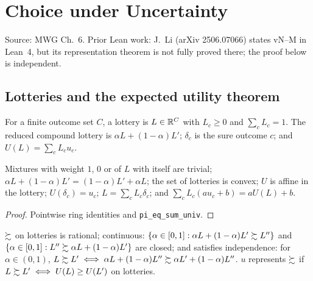 \chapter{Choice under Uncertainty}
\label{chap:uncertainty}

Source: MWG Ch.~6. Prior Lean work: J.~Li (arXiv 2506.07066) states vN--M in Lean~4, but its
representation theorem is not fully proved there; the proof below is independent.

\section{Lotteries and the expected utility theorem}
\label{sec:vnm}

\begin{definition}
\label{def:lottery}
\leanok
For a finite outcome set $C$, a lottery is $L \in \mathbb{R}^C$ with $L_c \ge 0$ and $\sum_c L_c = 1$. The
reduced compound lottery is $\alpha L + (1-\alpha) L'$; $\delta_c$ is the sure outcome $c$; and
$U(L) = \sum_c L_c u_c$.
\end{definition}

\begin{lemma}
\label{lem:mix-algebra}
\leanok
{}
Mixtures with weight $1$, $0$ or of $L$ with itself are trivial; $\alpha L + (1-\alpha)L' =
(1-\alpha)L' + \alpha L$; the set of lotteries is convex; $U$ is affine in the lottery;
$U(\delta_c) = u_c$; $L = \sum_c L_c \delta_c$; and $\sum_c L_c (a u_c + b) = a U(L) + b$.
\end{lemma}
\begin{proof}
\leanok
Pointwise ring identities and \texttt{pi\_eq\_sum\_univ}.
\end{proof}

\begin{definition}
\label{def:vnm-axioms}
\leanok
{}
$\succsim$ on lotteries is rational; continuous: $\{\alpha \in [0,1] : \alpha L + (1-\alpha)L' \succsim L''\}$
and $\{\alpha \in [0,1] : L'' \succsim \alpha L + (1-\alpha)L'\}$ are closed; and satisfies independence:
for $\alpha \in (0,1)$, $L \succsim L' \iff \alpha L + (1-\alpha)L'' \succsim \alpha L' + (1-\alpha) L''$.
$u$ represents $\succsim$ if $L \succsim L' \iff U(L) \ge U(L')$ on lotteries.
\end{definition}

